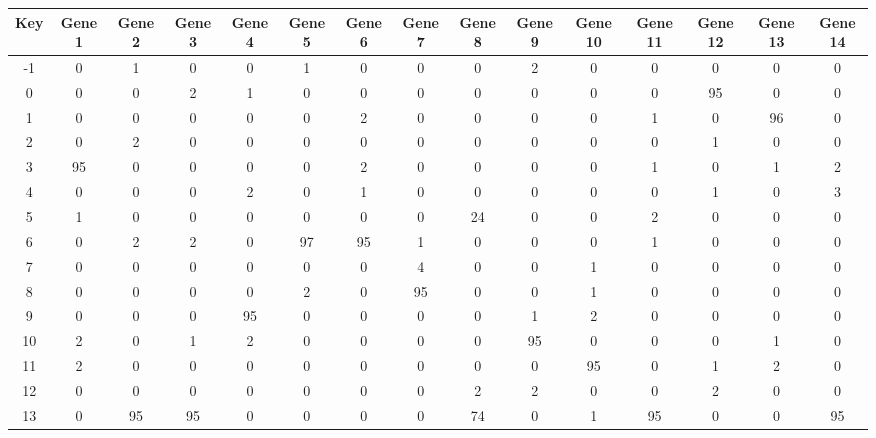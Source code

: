 \begin{tabular}{|c|c|c|c|c|c|c|c|c|c|c|c|c|c|c|}
\hline
Key & Gene 1 & Gene 2 & Gene 3 & Gene 4 & Gene 5 & Gene 6 & Gene 7 & Gene 8 & Gene 9 & Gene 10 & Gene 11 & Gene 12 & Gene 13 & Gene 14 \\
\hline
-1 & 0 & 1 & 0 & 0 & 1 & 0 & 0 & 0 & 2 & 0 & 0 & 0 & 0 & 0 \\
0 & 0 & 0 & 2 & 1 & 0 & 0 & 0 & 0 & 0 & 0 & 0 & 95 & 0 & 0 \\
1 & 0 & 0 & 0 & 0 & 0 & 2 & 0 & 0 & 0 & 0 & 1 & 0 & 96 & 0 \\
2 & 0 & 2 & 0 & 0 & 0 & 0 & 0 & 0 & 0 & 0 & 0 & 1 & 0 & 0 \\
3 & 95 & 0 & 0 & 0 & 0 & 2 & 0 & 0 & 0 & 0 & 1 & 0 & 1 & 2 \\
4 & 0 & 0 & 0 & 2 & 0 & 1 & 0 & 0 & 0 & 0 & 0 & 1 & 0 & 3 \\
5 & 1 & 0 & 0 & 0 & 0 & 0 & 0 & 24 & 0 & 0 & 2 & 0 & 0 & 0 \\
6 & 0 & 2 & 2 & 0 & 97 & 95 & 1 & 0 & 0 & 0 & 1 & 0 & 0 & 0 \\
7 & 0 & 0 & 0 & 0 & 0 & 0 & 4 & 0 & 0 & 1 & 0 & 0 & 0 & 0 \\
8 & 0 & 0 & 0 & 0 & 2 & 0 & 95 & 0 & 0 & 1 & 0 & 0 & 0 & 0 \\
9 & 0 & 0 & 0 & 95 & 0 & 0 & 0 & 0 & 1 & 2 & 0 & 0 & 0 & 0 \\
10 & 2 & 0 & 1 & 2 & 0 & 0 & 0 & 0 & 95 & 0 & 0 & 0 & 1 & 0 \\
11 & 2 & 0 & 0 & 0 & 0 & 0 & 0 & 0 & 0 & 95 & 0 & 1 & 2 & 0 \\
12 & 0 & 0 & 0 & 0 & 0 & 0 & 0 & 2 & 2 & 0 & 0 & 2 & 0 & 0 \\
13 & 0 & 95 & 95 & 0 & 0 & 0 & 0 & 74 & 0 & 1 & 95 & 0 & 0 & 95 \\
\hline
\end{tabular}